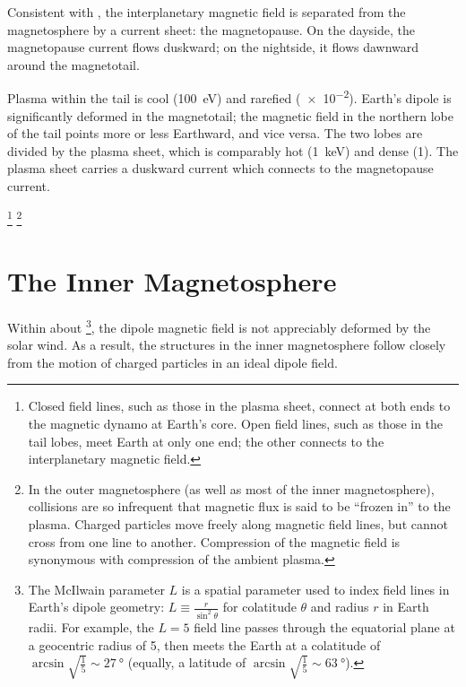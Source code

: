 Consistent with \amplaw, the interplanetary magnetic field is separated from the magnetosphere by a current sheet: the magnetopause. On the dayside, the magnetopause current flows duskward; on the nightside, it flows dawnward around the magnetotail. 

Plasma within the tail is cool (\about\SI{100}{\eV}) and rarefied (\about\SI{e-2}{\percc}). Earth's dipole is significantly deformed in the magnetotail; the magnetic field in the northern lobe of the tail points more or less Earthward, and vice versa. The two lobes are divided by the plasma sheet, which is comparably hot (\about\SI{1}{\keV}) and dense (\about\SI{1}{\percc}). The plasma sheet carries a duskward current which connects to the magnetopause current. 

\footnote{Closed field lines, such as those in the plasma sheet, connect at both ends to the magnetic dynamo at Earth's core. Open field lines, such as those in the tail lobes, meet Earth at only one end; the other connects to the interplanetary magnetic field. }
\footnote{In the outer magnetosphere (as well as most of the inner magnetosphere), collisions are so infrequent that magnetic flux is said to be ``frozen in'' to the plasma. Charged particles move freely along magnetic field lines, but cannot cross from one line to another. Compression of the magnetic field is synonymous with compression of the ambient plasma. }

\section{The Inner Magnetosphere}

Within about \footnote{The McIlwain parameter $L$ is a spatial parameter used to index field lines in Earth's dipole geometry: $L \equiv \frac{r}{\sin^2\theta}$ for colatitude $\theta$ and radius $r$ in Earth radii. For example, the $L=5$ field line passes through the equatorial plane at a geocentric radius of \SI{5}{\RE}, then meets the Earth at a colatitude of $\arcsin \sqrt{ \frac{1}{5} } \sim \SI{27}{\degree}$ (equally, a latitude of $\arcsin \sqrt{ \frac{1}{5} } \sim \SI{63}{\degree}$). }, the dipole magnetic field is not appreciably deformed by the solar wind. As a result, the structures in the inner magnetosphere follow closely from the motion of charged particles in an ideal dipole field. 

